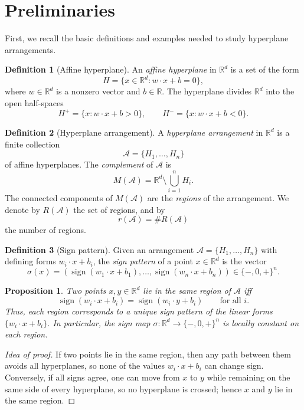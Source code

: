 \documentclass[12pt]{amsart}
\theoremstyle{plain}
\newtheorem{proposition}{Proposition}[section]
\theoremstyle{definition}
\newtheorem{definition}{Definition}[section]
\theoremstyle{remark}
\newcommand{\R}{\mathbb{R}}
\newcommand{\A}{\mathcal{A}}
\begin{document}
\section{Preliminaries}
\noindent First, we recall the basic definitions and examples needed to study hyperplane arrangements.

\begin{definition}[Affine hyperplane]
An \emph{affine hyperplane} in $\R^d$ is a set of the form
\[
H = \{ x \in \R^d : w \cdot x + b = 0 \},
\]
where $w \in \R^d$ is a nonzero vector and $b \in \R$.
The hyperplane divides $\R^d$ into the open half-spaces
\[
H^{+} = \{x : w \cdot x + b > 0\}, \qquad
H^{-} = \{x : w \cdot x + b < 0\}.
\]
\end{definition}

\begin{definition}[Hyperplane arrangement]
A \emph{hyperplane arrangement} in $\R^d$ is a finite collection
\[
\A = \{H_1, \dots, H_n\}
\]
of affine hyperplanes.  
The \emph{complement} of $\A$ is
\[
M(\A) = \R^d \setminus \bigcup_{i=1}^n H_i.
\]
The connected components of $M(\A)$ are the \emph{regions}
of the arrangement.  
We denote by $R(\A)$ the set of regions, and by
\[
r(\A) = \# R(\A)
\]
the number of regions.
\end{definition}

\begin{definition}[Sign pattern]
Given an arrangement $\A = \{H_1,\dots,H_n\}$ with defining
forms $w_i \cdot x + b_i$, the \emph{sign pattern} of a point
$x \in \R^d$ is the vector
\[
\sigma(x) = 
(\operatorname{sign}(w_1 \cdot x + b_1),\dots,
 \operatorname{sign}(w_n \cdot x + b_n))
\in \{-,0,+\}^n.
\]
\end{definition}

\begin{proposition}
Two points $x,y \in \R^d$ lie in the same region of $\A$ iff
\[
\operatorname{sign}(w_i \cdot x + b_i)
  = \operatorname{sign}(w_i \cdot y + b_i)
  \qquad \text{for all } i.
\]
Thus, each region corresponds to a unique sign pattern of the linear forms
$\{ w_i \cdot x + b_i \}$. In particular, the sign map $\sigma\colon \R^d \to \{-,0,+\}^n$ is locally constant on each region.
\end{proposition}

\begin{proof}[Idea of proof]
If two points lie in the same region, then any path between them avoids all hyperplanes, so none of the values $w_i \cdot x + b_i$ can change sign.  
Conversely, if all signs agree, one can move from $x$ to $y$ while  remaining on the same side of every hyperplane, so no hyperplane is crossed; hence $x$ and $y$ lie in the same region.
\end{proof}
\end{document}

